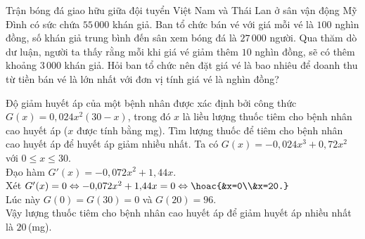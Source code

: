 \begin{ex}%
Trận bóng đá giao hữu giữa đội tuyển Việt Nam và Thái Lan ở sân vận động Mỹ Đình có sức chứa $55\,000$ khán giả. Ban tổ chức bán vé với giá mỗi vé là $100$ nghìn đồng, số khán giả trung bình đến sân xem bóng đá là $27\,000$ người. Qua thăm dò dư luận, người ta thấy rằng mỗi khi giá vé giảm thêm $10$ nghìn đồng, sẽ có thêm khoảng $3\,000$ khán giả. Hỏi ban tổ chức nên đặt giá vé là bao nhiêu để doanh thu từ tiền bán vé là lớn nhất với đơn vị tính giá vé là nghìn đồng?
\end{ex}

\begin{ex}%
Độ giảm huyết áp của một bệnh nhân được xác định bởi công thức $G(x)=0{,}024x^2(30-x)$, trong đó $x$ là liều lượng thuốc tiêm cho bệnh nhân cao huyết áp ($x$ được tính bằng mg). Tìm lượng thuốc để tiêm cho bệnh nhân cao huyết áp để huyết áp giảm nhiều nhất.
\loigiai
{
Ta có $G(x)=-0{,}024x^3+0{,}72x^2$ với $0\le x\le 30$.\\
Đạo hàm $G'(x)=-0{,}072x^2+1{,}44x$.\\
Xét $G'(x)=0\Leftrightarrow -0{,}072x^2+1{,}44x=0\Leftrightarrow\hoac{&x=0\\&x=20.}$\\
Lúc này $G(0)=G(30)=0$ và $G(20)=96$.\\
Vậy lượng thuốc tiêm cho bệnh nhân cao huyết áp để giảm huyết áp nhiều nhất là $20$\,(mg).
}
\end{ex}

